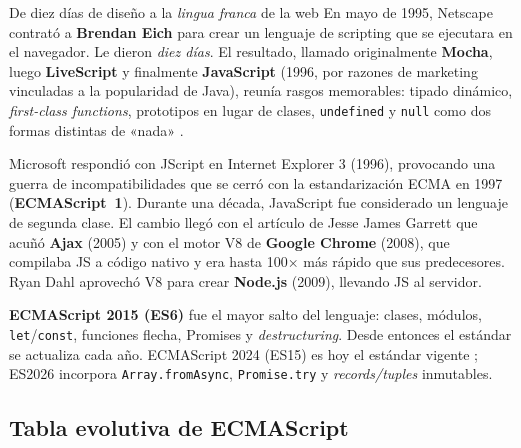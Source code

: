 \documentclass[11pt,a4paper,openany]{book}
\begin{document}
	\begin{cajahistoria}{De diez días de diseño a la \emph{lingua franca} de la web}
		En mayo de 1995, Netscape contrató a \textbf{Brendan Eich} para
		crear un lenguaje de scripting que se ejecutara en el navegador.
		Le dieron \emph{diez días}. El resultado, llamado originalmente
		\textbf{Mocha}, luego \textbf{LiveScript} y finalmente
		\textbf{JavaScript} (1996, por razones de marketing vinculadas a la
		popularidad de Java), reunía rasgos memorables: tipado dinámico,
		\emph{first-class functions}, prototipos en lugar de clases,
		\texttt{undefined} y \texttt{null} como dos formas distintas de
		«nada» \cite{crockford2008javascript}.
		
		Microsoft respondió con JScript en Internet Explorer 3 (1996),
		provocando una guerra de incompatibilidades que se cerró con la
		estandarización ECMA en 1997 (\textbf{ECMAScript~1}). Durante una
		década, JavaScript fue considerado un lenguaje de segunda clase.
		El cambio llegó con el artículo de Jesse James Garrett que acuñó
		\textbf{Ajax} (2005) \cite{garrett2005ajax} y con el motor V8 de
		\textbf{Google Chrome} (2008), que compilaba JS a código nativo y
		era hasta 100× más rápido que sus predecesores. Ryan Dahl aprovechó
		V8 para crear \textbf{Node.js} (2009), llevando JS al servidor.
		
		\textbf{ECMAScript 2015 (ES6)} fue el mayor salto del lenguaje:
		clases, módulos, \texttt{let}/\texttt{const}, funciones flecha,
		Promises y \emph{destructuring}. Desde entonces el estándar se
		actualiza cada año. ECMAScript 2024 (ES15) es hoy el estándar
		vigente \cite{ecma2024}; ES2026 incorpora
		\texttt{Array.fromAsync}, \texttt{Promise.try} y
		\emph{records/tuples} inmutables.
	\end{cajahistoria}
	
	\subsection{Tabla evolutiva de ECMAScript}
	\label{sub:4.ecma}
	
\end{document}
